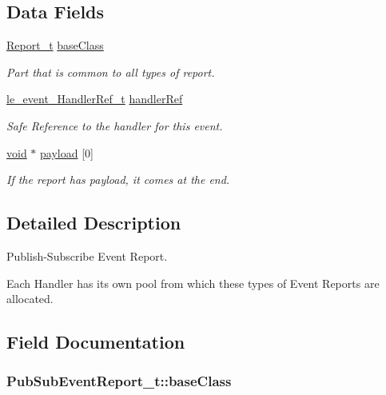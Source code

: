 \subsection*{Data Fields}
\begin{DoxyCompactItemize}
\item 
\hyperlink{struct_report__t}{Report\+\_\+t} \hyperlink{struct_pub_sub_event_report__t_a162a1037eaf1db4fe271454d272a8ec0}{base\+Class}
\begin{DoxyCompactList}\small\item\em Part that is common to all types of report. \end{DoxyCompactList}\item 
\hyperlink{le__event_loop_8h_ae7ab96b8e3441b3d484fcf52aa7a9dad}{le\+\_\+event\+\_\+\+Handler\+Ref\+\_\+t} \hyperlink{struct_pub_sub_event_report__t_af15c8b515622b3484191355b4f8d2ad2}{handler\+Ref}
\begin{DoxyCompactList}\small\item\em Safe Reference to the handler for this event. \end{DoxyCompactList}\item 
\hyperlink{_t_e_m_p_l_a_t_e__cdef_8h_ac9c84fa68bbad002983e35ce3663c686}{void} $\ast$ \hyperlink{struct_pub_sub_event_report__t_a3e532f669933750e7fc69d1487047dfd}{payload} \mbox{[}0\mbox{]}
\begin{DoxyCompactList}\small\item\em If the report has payload, it comes at the end. \end{DoxyCompactList}\end{DoxyCompactItemize}


\subsection{Detailed Description}
Publish-\/\+Subscribe Event Report.

Each Handler has its own pool from which these types of Event Reports are allocated. 

\subsection{Field Documentation}
\subsubsection[{\texorpdfstring{base\+Class}{baseClass}}]{ Pub\+Sub\+Event\+Report\+\_\+t\+::base\+Class}\hypertarget{struct_pub_sub_event_report__t_a162a1037eaf1db4fe271454d272a8ec0}{}\label{struct_pub_sub_event_report__t_a162a1037eaf1db4fe271454d272a8ec0}


